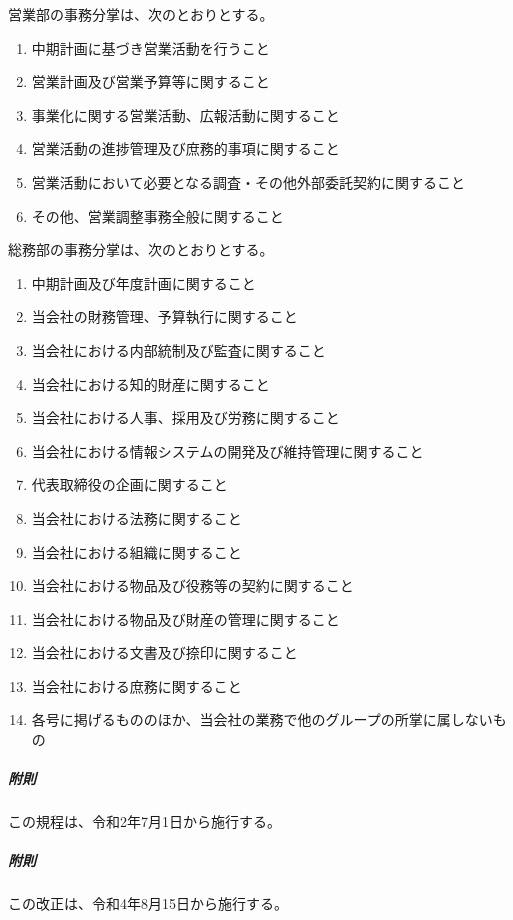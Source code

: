 \documentclass[10pt,a4paper,uplatex]{jsarticle}
\begin{document}
営業部の事務分掌は、次のとおりとする。
\begin{enumerate}
	\item 中期計画に基づき営業活動を行うこと	
	\item 営業計画及び営業予算等に関すること
	\item 事業化に関する営業活動、広報活動に関すること
	\item 営業活動の進捗管理及び庶務的事項に関すること
	\item 営業活動において必要となる調査・その他外部委託契約に関すること
	\item その他、営業調整事務全般に関すること
\end{enumerate}

総務部の事務分掌は、次のとおりとする。
\begin{enumerate}
	\item 中期計画及び年度計画に関すること
	\item 当会社の財務管理、予算執行に関すること
	\item 当会社における内部統制及び監査に関すること
	\item 当会社における知的財産に関すること
	\item 当会社における人事、採用及び労務に関すること
	\item 当会社における情報システムの開発及び維持管理に関すること
	\item 代表取締役の企画に関すること
	\item 当会社における法務に関すること
	\item 当会社における組織に関すること
	\item 当会社における物品及び役務等の契約に関すること
	\item 当会社における物品及び財産の管理に関すること
	\item 当会社における文書及び捺印に関すること
	\item 当会社における庶務に関すること
	\item 各号に掲げるもののほか、当会社の業務で他のグループの所掌に属しないもの
\end{enumerate}

\vspace{1cm}
\subparagraph{附則}
この規程は、令和2年7月1日から施行する。
\subparagraph{附則}
この改正は、令和4年8月15日から施行する。 
\end{document}
